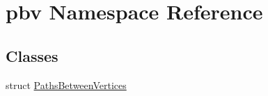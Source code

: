 \hypertarget{namespacepbv}{}\section{pbv Namespace Reference}
\label{namespacepbv}
\subsection*{Classes}
\begin{DoxyCompactItemize}
\item 
struct \mbox{\hyperlink{structpbv_1_1_paths_between_vertices}{Paths\+Between\+Vertices}}
\end{DoxyCompactItemize}
